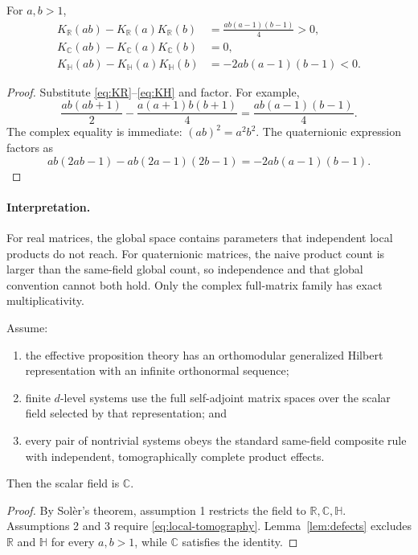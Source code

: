 \documentclass[11pt]{article}
\newcommand{\R}{\mathbb{R}}
\newcommand{\C}{\mathbb{C}}
\newcommand{\HH}{\mathbb{H}}
\begin{document}
\begin{lemma}
\label{lem:defects}
For \(a,b>1\),
\begin{align}
K_{\R}(ab)-K_{\R}(a)K_{\R}(b)
&=\frac{ab(a-1)(b-1)}{4}>0,\label{eq:real-defect}\\
K_{\C}(ab)-K_{\C}(a)K_{\C}(b)
&=0,\label{eq:complex-defect}\\
K_{\HH}(ab)-K_{\HH}(a)K_{\HH}(b)
&=-2ab(a-1)(b-1)<0.\label{eq:quat-defect}
\end{align}
\end{lemma}

\begin{proof}
Substitute \eqref{eq:KR}--\eqref{eq:KH} and factor. For example,
\[
\frac{ab(ab+1)}2
-\frac{a(a+1)b(b+1)}4
=\frac{ab(a-1)(b-1)}4.
\]
The complex equality is immediate:
\((ab)^2=a^2b^2\). The quaternionic expression factors as
\[
ab(2ab-1)-ab(2a-1)(2b-1)
=-2ab(a-1)(b-1).
\]
\end{proof}

\paragraph{Interpretation.}
For real matrices, the global space contains parameters that independent local products do not reach. For quaternionic matrices, the naive product count is larger than the same-field global count, so independence and that global convention cannot both hold. Only the complex full-matrix family has exact multiplicativity.

\begin{theorem}
\label{thm:rigidity}
Assume:
\begin{enumerate}
\item the effective proposition theory has an orthomodular generalized Hilbert representation with an infinite orthonormal sequence;
\item finite \(d\)-level systems use the full self-adjoint matrix spaces over the scalar field selected by that representation; and
\item every pair of nontrivial systems obeys the standard same-field composite rule with independent, tomographically complete product effects.
\end{enumerate}
Then the scalar field is \(\C\).
\end{theorem}

\begin{proof}
By Sol\`er's theorem, assumption 1 restricts the field to
\(\R,\C,\HH\). Assumptions 2 and 3 require
\eqref{eq:local-tomography}. Lemma~\ref{lem:defects} excludes
\(\R\) and \(\HH\) for every \(a,b>1\), while \(\C\) satisfies the identity.
\end{proof}
\end{document}
